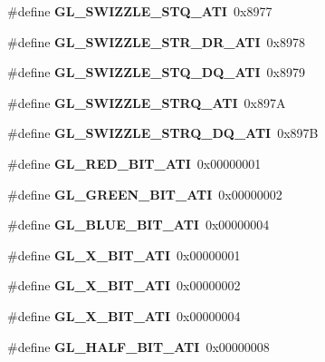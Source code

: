 \begin{DoxyCompactItemize}
\item 
\#define {\bfseries G\+L\+\_\+\+S\+W\+I\+Z\+Z\+L\+E\+\_\+\+S\+T\+Q\+\_\+\+A\+T\+I}~0x8977\label{_s_d_l__opengl_8h_a2c28ffe251eae1e411b9ab069758b965}

\item 
\#define {\bfseries G\+L\+\_\+\+S\+W\+I\+Z\+Z\+L\+E\+\_\+\+S\+T\+R\+\_\+\+D\+R\+\_\+\+A\+T\+I}~0x8978\label{_s_d_l__opengl_8h_a22cf8ec81426cd1d9589a7be018182c5}

\item 
\#define {\bfseries G\+L\+\_\+\+S\+W\+I\+Z\+Z\+L\+E\+\_\+\+S\+T\+Q\+\_\+\+D\+Q\+\_\+\+A\+T\+I}~0x8979\label{_s_d_l__opengl_8h_a3011095062d59fd9025631d73aa34d50}

\item 
\#define {\bfseries G\+L\+\_\+\+S\+W\+I\+Z\+Z\+L\+E\+\_\+\+S\+T\+R\+Q\+\_\+\+A\+T\+I}~0x897\+A\label{_s_d_l__opengl_8h_acba5bb81f3cd87ce706d2119f43121a7}

\item 
\#define {\bfseries G\+L\+\_\+\+S\+W\+I\+Z\+Z\+L\+E\+\_\+\+S\+T\+R\+Q\+\_\+\+D\+Q\+\_\+\+A\+T\+I}~0x897\+B\label{_s_d_l__opengl_8h_a93c55cec6eb01b32e4e31f0955042cce}

\item 
\#define {\bfseries G\+L\+\_\+\+R\+E\+D\+\_\+\+B\+I\+T\+\_\+\+A\+T\+I}~0x00000001\label{_s_d_l__opengl_8h_a1bb772e513934dcce901bc8c87b21e8c}

\item 
\#define {\bfseries G\+L\+\_\+\+G\+R\+E\+E\+N\+\_\+\+B\+I\+T\+\_\+\+A\+T\+I}~0x00000002\label{_s_d_l__opengl_8h_a310590938bea2b709ecb424be4cd78a9}

\item 
\#define {\bfseries G\+L\+\_\+\+B\+L\+U\+E\+\_\+\+B\+I\+T\+\_\+\+A\+T\+I}~0x00000004\label{_s_d_l__opengl_8h_ac1466f113ced7af99ada97c910175a07}

\item 
\#define {\bfseries G\+L\+\_\+X\+\_\+\+B\+I\+T\+\_\+\+A\+T\+I}~0x00000001\label{_s_d_l__opengl_8h_a377aec5d6de6a0065d9d1e0737fe3d30}

\item 
\#define {\bfseries G\+L\+\_\+X\+\_\+\+B\+I\+T\+\_\+\+A\+T\+I}~0x00000002\label{_s_d_l__opengl_8h_a7811821ec70db409ee59fa2a8619e34b}

\item 
\#define {\bfseries G\+L\+\_\+X\+\_\+\+B\+I\+T\+\_\+\+A\+T\+I}~0x00000004\label{_s_d_l__opengl_8h_a5117916e92fe65a48cdb4e8152bf5a69}

\item 
\#define {\bfseries G\+L\+\_\+\+H\+A\+L\+F\+\_\+\+B\+I\+T\+\_\+\+A\+T\+I}~0x00000008\label{_s_d_l__opengl_8h_a83ed6ace9730d728c106bf3175e9977f}


\end{DoxyCompactItemize}
